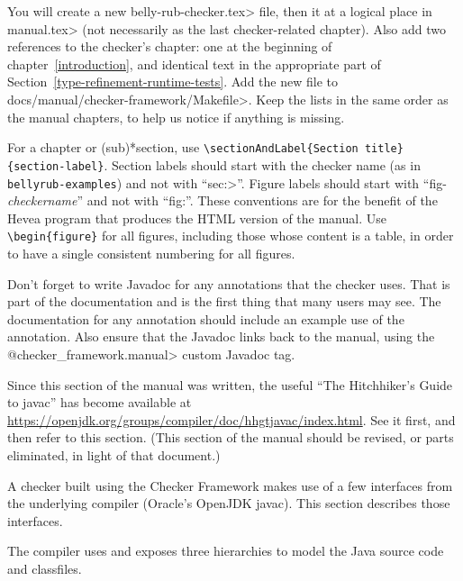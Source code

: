 You will create a new \<belly-rub-checker.tex> file,
then \verb|| it at a logical place in \<manual.tex> (not
necessarily as the last checker-related chapter).  Also add two references
to the checker's chapter:  one at the beginning of
chapter~\ref{introduction}, and identical text in the appropriate part of
Section~\ref{type-refinement-runtime-tests}.  Add the new file to
\<docs/manual/checker-framework/Makefile>.  Keep the lists in
the same order as the manual chapters, to help us notice if anything is
missing.

For a chapter or (sub)*section, use \verb|\sectionAndLabel{Section title}{section-label}|.
Section labels should start with the checker
name (as in \verb|bellyrub-examples|) and not with ``\<sec:>''.
Figure labels should start with ``fig-\emph{checkername}'' and not with ``fig:''.
These conventions are for the benefit of the Hevea program that produces
the HTML version of the manual.
Use \verb|\begin{figure}| for all figures, including those whose
content is a table, in order to have a single consistent numbering for all
figures.

Don't forget to write Javadoc for any annotations that the checker uses.
That is part of the documentation and is the first thing that many users
may see.  The documentation for any annotation should include an example
use of the annotation.
Also ensure that the Javadoc links back to the manual, using the
\<@checker\_framework.manual> custom Javadoc tag.



Since this section of the manual was written, the useful ``The Hitchhiker's
Guide to javac'' has become available at
\url{https://openjdk.org/groups/compiler/doc/hhgtjavac/index.html}.
See it first, and then refer to this section.  (This section of the manual
should be revised, or parts eliminated, in light of that document.)


A checker built using the Checker Framework makes use of a few interfaces
from the underlying compiler (Oracle's OpenJDK javac).
This section describes those interfaces.





The compiler uses and exposes three hierarchies to model the Java
source code and classfiles.



